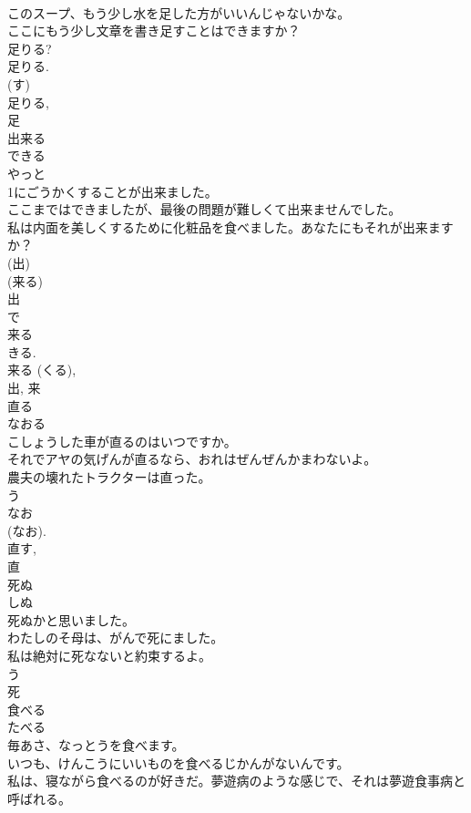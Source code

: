 \documentclass[8pt]{extreport}
\begin{document}
\begin{CJK}{UTF8}{min}
\\	このスープ、もう少し水を足した方がいいんじゃないかな。	
\\	ここにもう少し文章を書き足すことはできますか？	
\\	足りる? 
\\	足りる. 
\\	(す) 
\\	足りる, 
\\	足	
\\	出来る	
\\	できる	
\\	やっと
\\	1にごうかくすることが出来ました。	
\\	ここまではできましたが、最後の問題が難しくて出来ませんでした。	
\\	私は内面を美しくするために化粧品を食べました。あなたにもそれが出来ますか？	
\\	(出) 
\\	(来る) 
\\	出 
\\	で 
\\	来る 
\\	きる. 
\\	来る (くる), 
\\	出, 来	
\\	直る	
\\	なおる	
\\	こしょうした車が直るのはいつですか。	
\\	それでアヤの気げんが直るなら、おれはぜんぜんかまわないよ。	
\\	農夫の壊れたトラクターは直った。	
\\	う 
\\	なお 
\\	(なお). 
\\	直す, 
\\	直	
\\	死ぬ	
\\	しぬ	
\\	死ぬかと思いました。	
\\	わたしのそ母は、がんで死にました。	
\\	私は絶対に死なないと約束するよ。	
\\	う 
\\	死	
\\	食べる	
\\	たべる	
\\	毎あさ、なっとうを食べます。	
\\	いつも、けんこうにいいものを食べるじかんがないんです。	
\\	私は、寝ながら食べるのが好きだ。夢遊病のような感じで、それは夢遊食事病と呼ばれる。	

\end{CJK}
\end{document}
